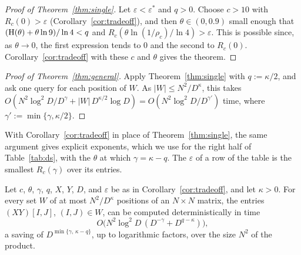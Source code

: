\begin{proof}[Proof of Theorem~\ref{thm:single}]
Let $\varepsilon<\varepsilon^*$ and $q>0$. Choose $c>10$ with $R_c(0)>\varepsilon$ (Corollary~\ref{cor:tradeoff}), and then $\theta\in(0,0.9)$ small enough that $(\operatorname{H}(\theta)+\theta\ln9)/\ln4<q$ and $R_c(\theta\ln(1/\rho_c)/\ln4)>\varepsilon$. This is possible since, as $\theta\to0$, the first expression tends to $0$ and the second to $R_c(0)$. Corollary~\ref{cor:tradeoff} with these $c$ and $\theta$ gives the theorem.
\end{proof}

\begin{proof}[Proof of Theorem~\ref{thm:general}]
Apply Theorem~\ref{thm:single} with $q:=\kappa/2$, and ask one query for each position of $W$. As $|W|\le N^2/D^{\kappa}$, this takes $O(N^2\log^2\!D/D^{\gamma}+|W|\,D^{\kappa/2}\log D)=O(N^2\log^2\!D/D^{\gamma'})$ time, where $\gamma':=\min\{\gamma,\kappa/2\}$.
\end{proof}

With Corollary~\ref{cor:tradeoff} in place of Theorem~\ref{thm:single}, the same argument gives explicit exponents, which we use for the right half of Table~\ref{tab:ds}, with the $\theta$ at which $\gamma=\kappa-q$. The $\varepsilon$ of a row of the table is the smallest $R_c(\gamma)$ over its entries.

\begin{corollary}\label{cor:range}
Let $c$, $\theta$, $\gamma$, $q$, $X$, $Y$, $D$, and $\varepsilon$ be as in Corollary~\ref{cor:tradeoff}, and let $\kappa>0$. For every set $W$ of at most $N^2/D^{\kappa}$ positions of an $N\times N$ matrix, the entries $(XY)[I,J]$, $(I,J)\in W$, can be computed deterministically in time
\[
O\big(N^2\log^2\!D\,(D^{-\gamma}+D^{q-\kappa})\big),
\]
a saving of $D^{\min\{\gamma,\,\kappa-q\}}$, up to logarithmic factors, over the size $N^2$ of the product.
\end{corollary}

